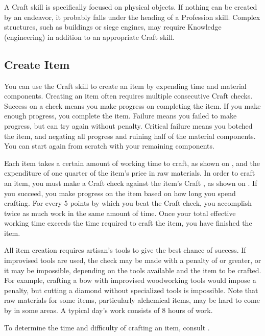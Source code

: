 
    A Craft skill is specifically focused on physical objects. If nothing can be created by an endeavor, it probably falls under the heading of a Profession skill. Complex structures, such as buildings or siege engines, may require Knowledge (engineering) in addition to an appropriate Craft skill.

    \subsection{Create Item}
        You can use the Craft skill to create an item by expending time and material components. Creating an item often requires multiple consecutive Craft checks. Success on a check means you make progress on completing the item. If you make enough progress, you complete the item. Failure means you failed to make progress, but can try again without penalty. Critical failure means you botched the item, and negating all progress and ruining half of the material components. You can start again from scratch with your remaining components.

        Each item takes a certain amount of working time to craft, as shown on , and the expenditure of one quarter of the item's price in raw materials. In order to craft an item, you must make a Craft check against the item's Craft , as shown on . If you succeed, you make progress on the item based on how long you spend crafting. For every 5 points by which you beat the Craft check, you accomplish twice as much work in the same amount of time. Once your total effective working time exceeds the time required to craft the item, you have finished the item.

        All item creation requires artisan's tools to give the best chance of success. If improvised tools are used, the check may be made with a penalty of  or greater, or it may be impossible, depending on the tools available and the item to be crafted. For example, crafting a bow with improvised woodworking tools would impose a  penalty, but cutting a diamond without specialized tools is impossible. Note that raw materials for some items, particularly alchemical items, may be hard to come by in some areas. A typical day's work consists of 8 hours of work.

        To determine the time and difficulty of crafting an item, consult .

